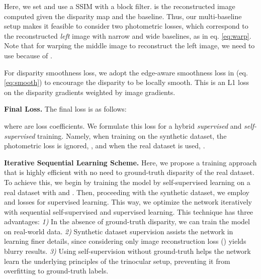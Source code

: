 \documentclass[10pt,twocolumn,letterpaper]{article}
\begin{document}
Here, we set  and use a SSIM with a  block filter.  is the reconstructed image computed given the disparity map and the baseline. Thus, our multi-baseline setup makes it feasible to consider two photometric losses, which correspond to the reconstructed \emph{left} image with narrow and wide baselines, as in eq. \ref{eq:warp}. Note that for warping the middle image to reconstruct the left image, we need to use  because of . 

For disparity smoothness loss, we adopt the edge-aware smoothness loss in \cite{heise2013pm} (eq. \ref{eq:smooth}) to encourage the disparity to be locally smooth. This is an L1 loss on the disparity gradients weighted by image gradients.

\noindent\textbf{Final Loss.}
The final loss is as follows:

where  are loss coefficients. We formulate this loss for a hybrid \emph{supervised} and \emph{self-supervised} training. Namely, when training on the synthetic dataset, the photometric loss is ignored, \ie , and when the real dataset is used, .

\noindent\textbf{Iterative Sequential Learning Scheme.} Here, we propose a training approach that is highly efficient with no need to ground-truth disparity of the real dataset. To achieve this, we begin by training the model by self-supervised learning on a real dataset with  and . Then, proceeding with the synthetic dataset, we employ  and  losses for supervised learning. This way, we optimize the network iteratively with sequential self-supervised and supervised learning. This technique has three advantages: \emph{1)} In the absence of ground-truth disparity, we can train the model on real-world data. \emph{2)} Synthetic dataset supervision assists the network in learning finer details, since considering only image reconstruction loss () yields blurry results. \emph{3)} Using self-supervision without ground-truth helps the network learn the underlying principles of the trinocular setup, preventing it from overfitting to ground-truth labels.
\end{document}
